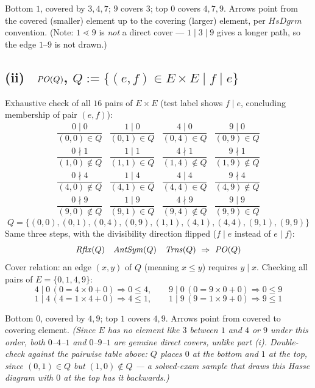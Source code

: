 \documentclass[11pt]{article}
\newcommand{\op}[1]{\mathit{#1}}
\newcommand{\circy}{\fbox{Y}} \newcommand{\circn}{\fbox{N}}
\newcommand{\seclabel}[1]{\noindent\fbox{\textbf{#1}}\par\smallskip}
\begin{document}
Bottom $1$, covered by $3,4,7$; $9$ covers $3$; top $0$ covers $4,7,9$. Arrows point from the covered (smaller) element up to the covering (larger) element, per $HsDgrm$ convention. (Note: $1\lessdot9$ is \emph{not} a direct cover --- $1\mid3\mid9$ gives a longer path, so the edge $1$--$9$ is not drawn.)

\subsection*{(ii) \circy\ $\PO(Q)$, $Q:=\{(e,f)\in E\times E\mid f\mid e\}$}
\seclabel{3a.ii}
Exhaustive check of all $16$ pairs of $E\times E$ (test label shows $f\mid e$, concluding membership of pair $(e,f)$):
\begingroup\scriptsize
\[
\begin{array}{cccc}
\dfrac{0\mid0}{(0,0)\in Q} & \dfrac{1\mid0}{(0,1)\in Q} & \dfrac{4\mid0}{(0,4)\in Q} & \dfrac{9\mid0}{(0,9)\in Q} \\[3mm]
\dfrac{0\nmid1}{(1,0)\notin Q} & \dfrac{1\mid1}{(1,1)\in Q} & \dfrac{4\nmid1}{(1,4)\notin Q} & \dfrac{9\nmid1}{(1,9)\notin Q} \\[3mm]
\dfrac{0\nmid4}{(4,0)\notin Q} & \dfrac{1\mid4}{(4,1)\in Q} & \dfrac{4\mid4}{(4,4)\in Q} & \dfrac{9\nmid4}{(4,9)\notin Q} \\[3mm]
\dfrac{0\nmid9}{(9,0)\notin Q} & \dfrac{1\mid9}{(9,1)\in Q} & \dfrac{4\nmid9}{(9,4)\notin Q} & \dfrac{9\mid9}{(9,9)\in Q}
\end{array}
\]
\endgroup
\[
Q = \{(0,0),(0,1),(0,4),(0,9),(1,1),(4,1),(4,4),(9,1),(9,9)\}
\]
Same three steps, with the divisibility direction flipped ($f\mid e$ instead of $e\mid f$):
\[
\op{Rflx}(Q)\quad\op{AntSym}(Q)\quad\op{Trns}(Q)\ \Rightarrow\ \PO(Q)
\]
Cover relation: an edge $(x,y)$ of $Q$ (meaning $x\le y$) requires $y\mid x$. Checking all pairs of $E=\{0,1,4,9\}$:
\[
4\mid0\,(0{=}4{\times}0{+}0)\Rightarrow0\le4,\qquad 9\mid0\,(0{=}9{\times}0{+}0)\Rightarrow0\le9
\]
\[
1\mid4\,(4{=}1{\times}4{+}0)\Rightarrow4\le1,\qquad 1\mid9\,(9{=}1{\times}9{+}0)\Rightarrow9\le1
\]
\begin{center}
\end{center}
Bottom $0$, covered by $4,9$; top $1$ covers $4,9$. Arrows point from covered to covering element.
\emph{(Since $E$ has no element like $3$ between $1$ and $4$ or $9$ under this order, both $0$--$4$--$1$ and $0$--$9$--$1$ are genuine direct covers, unlike part (i). Double-check against the pairwise table above: $Q$ places $0$ at the bottom and $1$ at the top, since $(0,1)\in Q$ but $(1,0)\notin Q$ --- a solved-exam sample that draws this Hasse diagram with $0$ at the top has it backwards.)}
\end{document}

